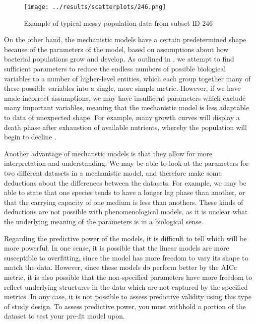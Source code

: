 \documentclass[11pt,a4wide,titlepage]{article}
\begin{document}
\begin{figure}
	\begin{center}
		\texttt{[image: ../results/scatterplots/246.png]}\\
		\caption{Example of typical messy population data from subset ID 246}\label{Messy}
	\end{center}
	\end{figure}


On the other hand, the mechanistic models have a certain predetermined shape because of the parameters of the model, based on assumptions about how bacterial populations grow and develop. As outlined in \cite{levinsSTRATEGYMODELBUILDING1966}, we attempt to find sufficient parameters to reduce the endless numbers of possible biological variables to a number of higher-level entities, which each group together many of these possible variables into a single, more simple metric. However, if we have made incorrect assumptions, we may have insufficent parameters which exclude many important variables, meaning that the mechanistic model is less adaptable to data of unexpected shape. For example, many growth curves will display a death phase after exhaustion of available nutrients, whereby the population will begin to decline \citep{whitingQuantitativeModelBacterial1992}.

Another advantage of mechanstic models is that they allow for more interpretation and understanding. We may be able to look at the parameters for two different datasets in a mechanistic model, and therefore make some deductions about the differences between the datasets. For example, we may be able to state that one species tends to have a longer lag phase than another, or that the carrying capacity of one medium is less than anothers. These kinds of deductions are not possible with phenomenological models, as it is unclear what the underlying meaning of the parameters is in a biological sense. 

Regarding the predictive power of the models, it is difficult to tell which will be more powerful. In one sense, it is possible that the linear models are more susceptible to overfitting, since the model has more freedom to vary its shape to match the data. However, since these models do perform better by the AICc metric, it is also possible that the non-specified parameters have more freedom to reflect underlying structures in the data which are not captured by the specified metrics. In any case, it is not possible to assess predictive validity using this type of study design. To assess predictive power, you must withhold a portion of the dataset to test your pre-fit model upon.
\end{document}
